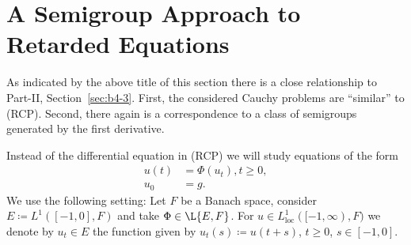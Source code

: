 \newpage
\section{A Semigroup Approach to Retarded Equations}\label{sec:c4-3}
%
%
%
\hspace{1cm}{\Large by Annette Grabosch and Ulrich Moustakas}
\vspace{.5cm}
\newline
{}
As indicated by the above title of this section there is a close relationship to Part-II, Section~\ref{sec:b4-3}.
First, the considered Cauchy problems are \enquote{similar} to (RCP).
Second, there again is a correspondence to a class of semigroups generated by the first derivative.

Instead of the differential equation in (RCP) we will study equations of the form
\begin{equation*}\label{eq:c4-re} \tag{RE}
\begin{split} 
u(t) &= \Phi(u_t),  t \geq 0,\\
u_0 &= g.
\end{split}
\end{equation*}
We use the following setting: Let $F$ be a Banach space, consider $E \coloneq L^{1}([-1,0],F)$ and take $\Phi \in \L{E,F}$.
For $u \in L^{1}_{\mathrm{loc}}([-1,\infty),F)$ we denote by $u_t \in E$ the function given by $u_t(s) \coloneq u(t+s)$, $t \geq 0$, $s \in [-1,0]$.

